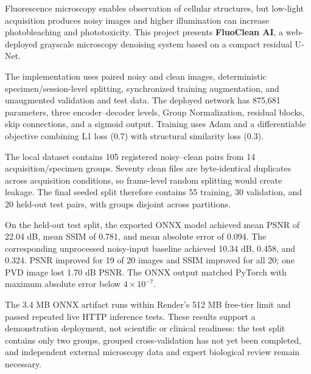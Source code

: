 \documentclass[12pt,a4paper]{report}
\begin{document}
Fluorescence microscopy enables observation of cellular structures, but low-light acquisition produces noisy images and higher illumination can increase photobleaching and phototoxicity. This project presents \textbf{FluoClean AI}, a web-deployed grayscale microscopy denoising system based on a compact residual U-Net.

\vspace{0.5cm}

The implementation uses paired noisy and clean images, deterministic specimen/session-level splitting, synchronized training augmentation, and unaugmented validation and test data. The deployed network has 875,681 parameters, three encoder--decoder levels, Group Normalization, residual blocks, skip connections, and a sigmoid output. Training uses Adam and a differentiable objective combining L1 loss (0.7) with structural similarity loss (0.3).

\vspace{0.5cm}

The local dataset contains 105 registered noisy--clean pairs from 14 acquisition/specimen groups. Seventy clean files are byte-identical duplicates across acquisition conditions, so frame-level random splitting would create leakage. The final seeded split therefore contains 55 training, 30 validation, and 20 held-out test pairs, with groups disjoint across partitions.

\vspace{0.5cm}

On the held-out test split, the exported ONNX model achieved mean PSNR of 22.04 dB, mean SSIM of 0.781, and mean absolute error of 0.094. The corresponding unprocessed noisy-input baseline achieved 10.34 dB, 0.458, and 0.324. PSNR improved for 19 of 20 images and SSIM improved for all 20; one PVD image lost 1.70 dB PSNR. The ONNX output matched PyTorch with maximum absolute error below $4\times10^{-7}$.

\vspace{0.5cm}

The 3.4 MB ONNX artifact runs within Render's 512 MB free-tier limit and passed repeated live HTTP inference tests. These results support a demonstration deployment, not scientific or clinical readiness: the test split contains only two groups, grouped cross-validation has not yet been completed, and independent external microscopy data and expert biological review remain necessary.

\vspace{0.5cm}
\end{document}
